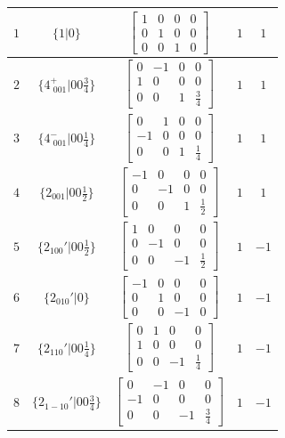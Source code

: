 \documentclass[fleqn,8pt]{jsarticle}
\begin{document}
\begin{longtable}{ccccc}
$ 1 $ & $ \{1|0\} $ & $ \begin{bmatrix} 1 & 0 & 0 & 0 \\ 0 & 1 & 0 & 0 \\ 0 & 0 & 1 & 0 \end{bmatrix} $ & $ 1 $ & $ 1 $ \\ \hline
$ 2 $ & $ \{4^{+}_{\,\,001}|0 0 \frac{3}{4}\} $ & $ \begin{bmatrix} 0 & -1 & 0 & 0 \\ 1 & 0 & 0 & 0 \\ 0 & 0 & 1 & \frac{3}{4} \end{bmatrix} $ & $ 1 $ & $ 1 $ \\ \hline
$ 3 $ & $ \{4^{-}_{\,\,001}|0 0 \frac{1}{4}\} $ & $ \begin{bmatrix} 0 & 1 & 0 & 0 \\ -1 & 0 & 0 & 0 \\ 0 & 0 & 1 & \frac{1}{4} \end{bmatrix} $ & $ 1 $ & $ 1 $ \\ \hline
$ 4 $ & $ \{2{}_{001}|0 0 \frac{1}{2}\} $ & $ \begin{bmatrix} -1 & 0 & 0 & 0 \\ 0 & -1 & 0 & 0 \\ 0 & 0 & 1 & \frac{1}{2} \end{bmatrix} $ & $ 1 $ & $ 1 $ \\ \hline
$ 5 $ & $ \{2{}_{100}{}'|0 0 \frac{1}{2}\} $ & $ \begin{bmatrix} 1 & 0 & 0 & 0 \\ 0 & -1 & 0 & 0 \\ 0 & 0 & -1 & \frac{1}{2} \end{bmatrix} $ & $ 1 $ & $ -1 $ \\ \hline
$ 6 $ & $ \{2{}_{010}{}'|0\} $ & $ \begin{bmatrix} -1 & 0 & 0 & 0 \\ 0 & 1 & 0 & 0 \\ 0 & 0 & -1 & 0 \end{bmatrix} $ & $ 1 $ & $ -1 $ \\ \hline
$ 7 $ & $ \{2{}_{110}{}'|0 0 \frac{1}{4}\} $ & $ \begin{bmatrix} 0 & 1 & 0 & 0 \\ 1 & 0 & 0 & 0 \\ 0 & 0 & -1 & \frac{1}{4} \end{bmatrix} $ & $ 1 $ & $ -1 $ \\ \hline
$ 8 $ & $ \{2{}_{1-10}{}'|0 0 \frac{3}{4}\} $ & $ \begin{bmatrix} 0 & -1 & 0 & 0 \\ -1 & 0 & 0 & 0 \\ 0 & 0 & -1 & \frac{3}{4} \end{bmatrix} $ & $ 1 $ & $ -1 $ \\
\end{longtable}
\end{document}
